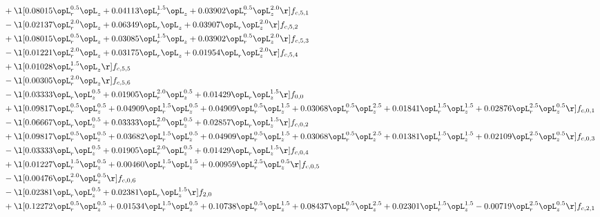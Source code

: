 \begin{alignat}{2}
& + \l[  0.08015 \opL_r^{0.5} \opL_z +  0.04113 \opL_r^{1.5} \opL_z +  0.03902 \opL_r^{0.5} \opL_z^{2.0}  \r] f_{c,5,1} \nonumber \\ 
& - \l[  0.02137 \opL_r^{2.0} \opL_z +  0.06349 \opL_r \opL_z +  0.03907 \opL_r \opL_z^{2.0}  \r] f_{c,5,2} \nonumber \\ 
& + \l[  0.08015 \opL_r^{0.5} \opL_z +  0.03085 \opL_r^{1.5} \opL_z +  0.03902 \opL_r^{0.5} \opL_z^{2.0}  \r] f_{c,5,3} \nonumber \\ 
& - \l[  0.01221 \opL_r^{2.0} \opL_z +  0.03175 \opL_r \opL_z +  0.01954 \opL_r \opL_z^{2.0}  \r] f_{c,5,4} \nonumber \\ 
& + \l[  0.01028 \opL_r^{1.5} \opL_z  \r] f_{c,5,5} \nonumber \\ 
& - \l[  0.00305 \opL_r^{2.0} \opL_z  \r] f_{c,5,6} \nonumber \\ 
& - \l[  0.03333 \opL_r \opL_z^{0.5} +  0.01905 \opL_r^{2.0} \opL_z^{0.5} +  0.01429 \opL_r \opL_z^{1.5}  \r] f_{0,0} \nonumber \\ 
& + \l[  0.09817 \opL_r^{0.5} \opL_z^{0.5} +  0.04909 \opL_r^{1.5} \opL_z^{0.5} +  0.04909 \opL_r^{0.5} \opL_z^{1.5} +  0.03068 \opL_r^{0.5} \opL_z^{2.5} +  0.01841 \opL_r^{1.5} \opL_z^{1.5} +  0.02876 \opL_r^{2.5} \opL_z^{0.5}  \r] f_{c,0,1} \nonumber \\ 
& - \l[  0.06667 \opL_r \opL_z^{0.5} +  0.03333 \opL_r^{2.0} \opL_z^{0.5} +  0.02857 \opL_r \opL_z^{1.5}  \r] f_{c,0,2} \nonumber \\ 
& + \l[  0.09817 \opL_r^{0.5} \opL_z^{0.5} +  0.03682 \opL_r^{1.5} \opL_z^{0.5} +  0.04909 \opL_r^{0.5} \opL_z^{1.5} +  0.03068 \opL_r^{0.5} \opL_z^{2.5} +  0.01381 \opL_r^{1.5} \opL_z^{1.5} +  0.02109 \opL_r^{2.5} \opL_z^{0.5}  \r] f_{c,0,3} \nonumber \\ 
& - \l[  0.03333 \opL_r \opL_z^{0.5} +  0.01905 \opL_r^{2.0} \opL_z^{0.5} +  0.01429 \opL_r \opL_z^{1.5}  \r] f_{c,0,4} \nonumber \\ 
& + \l[  0.01227 \opL_r^{1.5} \opL_z^{0.5} +  0.00460 \opL_r^{1.5} \opL_z^{1.5} +  0.00959 \opL_r^{2.5} \opL_z^{0.5}  \r] f_{c,0,5} \nonumber \\ 
& - \l[  0.00476 \opL_r^{2.0} \opL_z^{0.5}  \r] f_{c,0,6} \nonumber \\ 
& - \l[  0.02381 \opL_r \opL_z^{0.5} +  0.02381 \opL_r \opL_z^{1.5}  \r] f_{2,0} \nonumber \\ 
& + \l[  0.12272 \opL_r^{0.5} \opL_z^{0.5} +  0.01534 \opL_r^{1.5} \opL_z^{0.5} +  0.10738 \opL_r^{0.5} \opL_z^{1.5} +  0.08437 \opL_r^{0.5} \opL_z^{2.5} +  0.02301 \opL_r^{1.5} \opL_z^{1.5}   -0.00719 \opL_r^{2.5} \opL_z^{0.5}  \r] f_{c,2,1} \nonumber \\ 

\end{alignat}
